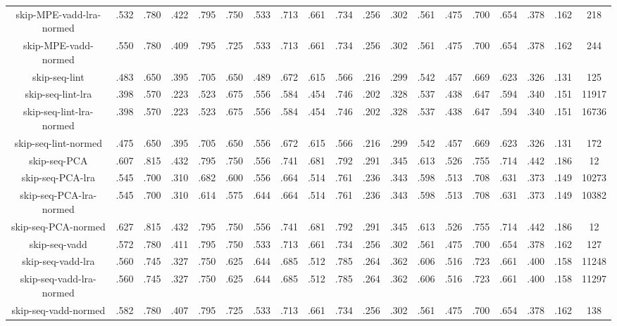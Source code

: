 {{\begin{tabular}{|c|c|c|c|c|c|c|c|c|c|c|c|c|c|c|c|c|c|c|}
    skip-MPE-vadd-lra-normed & .532 & .780 & .422 & .795 & .750 & .533 & .713 & .661 & .734 & .256 & .302 & .561 & .475 & .700 & .654 & .378 & .162 & 218 \\
    skip-MPE-vadd-normed & .550 & .780 & .409 & .795 & .725 & .533 & .713 & .661 & .734 & .256 & .302 & .561 & .475 & .700 & .654 & .378 & .162 & 244 \\
    \hline
    skip-seq-lint & .483 & .650 & .395 & .705 & .650 & .489 & .672 & .615 & .566 & .216 & .299 & .542 & .457 & .669 & .623 & .326 & .131 & 125 \\
    skip-seq-lint-lra & .398 & .570 & .223 & .523 & .675 & .556 & .584 & .454 & .746 & .202 & .328 & .537 & .438 & .647 & .594 & .340 & .151 & 11917 \\
    skip-seq-lint-lra-normed & .398 & .570 & .223 & .523 & .675 & .556 & .584 & .454 & .746 & .202 & .328 & .537 & .438 & .647 & .594 & .340 & .151 & 16736 \\
    skip-seq-lint-normed & .475 & .650 & .395 & .705 & .650 & .556 & .672 & .615 & .566 & .216 & .299 & .542 & .457 & .669 & .623 & .326 & .131 & 172 \\
    \hline
    skip-seq-PCA & .607 & .815 & .432 & .795 & .750 & .556 & .741 & .681 & .792 & .291 & .345 & .613 & .526 & .755 & .714 & .442 & .186 & 12 \\
    skip-seq-PCA-lra & .545 & .700 & .310 & .682 & .600 & .556 & .664 & .514 & .761 & .236 & .343 & .598 & .513 & .708 & .631 & .373 & .149 & 10273 \\
    skip-seq-PCA-lra-normed & .545 & .700 & .310 & .614 & .575 & .644 & .664 & .514 & .761 & .236 & .343 & .598 & .513 & .708 & .631 & .373 & .149 & 10382 \\
    skip-seq-PCA-normed & .627 & .815 & .432 & .795 & .750 & .556 & .741 & .681 & .792 & .291 & .345 & .613 & .526 & .755 & .714 & .442 & .186 & 12 \\
    \hline
    skip-seq-vadd & .572 & .780 & .411 & .795 & .750 & .533 & .713 & .661 & .734 & .256 & .302 & .561 & .475 & .700 & .654 & .378 & .162 & 127 \\
    skip-seq-vadd-lra & .560 & .745 & .327 & .750 & .625 & .644 & .685 & .512 & .785 & .264 & .362 & .606 & .516 & .723 & .661 & .400 & .158 & 11248 \\
    skip-seq-vadd-lra-normed & .560 & .745 & .327 & .750 & .625 & .644 & .685 & .512 & .785 & .264 & .362 & .606 & .516 & .723 & .661 & .400 & .158 & 11297 \\
    skip-seq-vadd-normed & .582 & .780 & .407 & .795 & .725 & .533 & .713 & .661 & .734 & .256 & .302 & .561 & .475 & .700 & .654 & .378 & .162 & 138 \\

\end{tabular}}}
